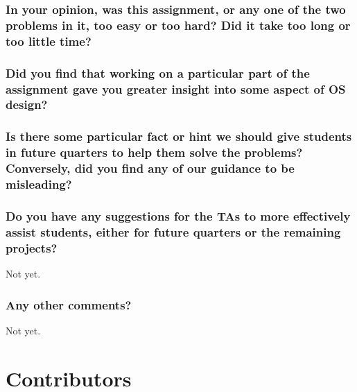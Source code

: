 \documentclass[sigconf, nonacm, balance=false, urlbreakonhyphens=true]{acmart}
\begin{document}

        \subsubsection*{In your opinion, was this assignment, or any one of the two problems in it, too easy or too hard? Did it take too long or too little time? }

        \subsubsection*{Did you find that working on a particular part of the assignment gave you greater insight into some aspect of OS design? }

        \subsubsection*{Is there some particular fact or hint we should give students in future quarters to help them solve the problems? Conversely, did you find any of our guidance to be misleading? }

        \subsubsection*{Do you have any suggestions for the TAs to more effectively assist students, either for future quarters or the remaining projects? }

            Not yet. 

        \subsubsection*{Any other comments? }

            Not yet. 
    
    \section*{Contributors}
\end{document}

